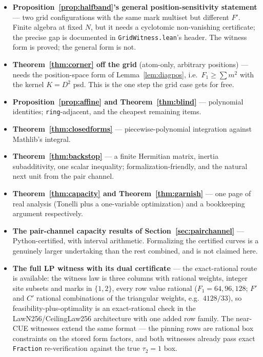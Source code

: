 \documentclass[11pt]{article}
\theoremstyle{plain}
\theoremstyle{definition}
\theoremstyle{remark}
\begin{document}
\begin{itemize}
\item \textbf{Proposition~\ref{prop:halfband}'s general position-sensitivity
  statement} --- two grid configurations with the same mark multiset but
  different $F'$. Finite algebra at fixed $N$, but it needs a cyclotomic
  non-vanishing certificate; the precise gap is documented in
  \texttt{GridWitness.lean}'s header. The witness form is proved; the general
  form is not.
\item \textbf{Theorem~\ref{thm:corner} off the grid} (atom-only, arbitrary
  positions) --- needs the position-space form of Lemma~\ref{lem:diagpos},
  i.e.\ $F_1 \ge \sum m^2$ with the kernel $K = D^2$ psd. This is the one step
  the grid case gets for free.
\item \textbf{Proposition~\ref{prop:affine} and Theorem~\ref{thm:blind}} ---
  polynomial identities; \texttt{ring}-adjacent, and the cheapest remaining
  items.
\item \textbf{Theorem~\ref{thm:closedforms}} --- piecewise-polynomial
  integration against Mathlib's integral.
\item \textbf{Theorem~\ref{thm:backstop}} --- a finite Hermitian matrix, inertia
  subadditivity, one scalar inequality; formalization-friendly, and the natural
  next unit from the pair channel.
\item \textbf{Theorem~\ref{thm:capacity} and Theorem~\ref{thm:garnish}} --- one
  page of real analysis (Tonelli plus a one-variable optimization) and a
  bookkeeping argument respectively.
\item \textbf{The pair-channel capacity results of
  Section~\ref{sec:pairchannel}} --- Python-certified, with interval arithmetic.
  Formalizing the certified curves is a genuinely larger undertaking than the
  rest combined, and is not claimed here.
\item \textbf{The full LP witness with its dual certificate} --- the
  exact-rational route is available: the witness law is three columns with
  rational weights, integer site subsets and marks in $\{1, 2\}$, every row value
  rational ($F_1 = 64, 96, 128$; $F'$ and $C'$ rational combinations of the
  triangular weights, e.g.\ $4128/33$), so feasibility-plus-optimality is an
  exact-rational check in the LawN256/CeilingLaw256 architecture with one added
  row family. The near-CUE witnesses extend the same format --- the pinning rows
  are rational box constraints on the stored form factors, and both witnesses
  already pass exact \texttt{Fraction} re-verification against the true
  $\tau_2 = 1$ box.
\end{itemize}
\end{document}
